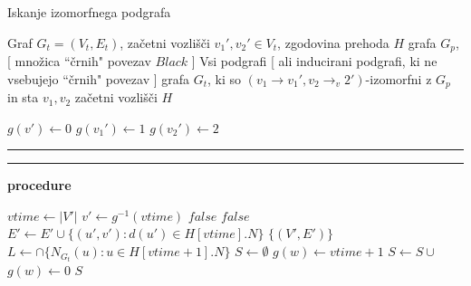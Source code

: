 \documentclass[a4paper, 12pt, ]{book}
\newcommand\Subalg[1]{%
	\Statex%
	\vspace*{-.7\baselineskip}%
	\hspace*{\dimexpr-\algorithmicindent-4pt\relax}%
	\rule{\textwidth}{0.4pt}%
	\Statex%
	
	\vspace*{-.7\baselineskip}%
	\Statex\hspace*{\dimexpr-\algorithmicindent-2pt\relax}%
	\rule{\textwidth}{0.4pt}%
	
	\Statex\hspace*{-\algorithmicindent}\textbf{procedure} #1%
}
\begin{document}
\begin{algorithm}
\caption{Iskanje izomorfnega podgrafa}
\label{alg:sub_st}
\begin{algorithmic}[1]
	\Require Graf $G_t = (V_t, E_t)$, začetni vozlišči $v_1', v_2' \in V_t$, zgodovina prehoda $H$ grafa $G_p$, [ množica ``črnih" povezav $Black$ ]
	\Ensure Vsi podgrafi [ ali inducirani podgrafi, ki ne vsebujejo ``črnih" povezav ] grafa $G_t$, ki so $(v_1 \to v_1', v_2 \to _v2')$-izomorfni z
	 $G_p$ in sta $v_1, v_2$ začetni vozlišči $H$
	 
	 		\label{line:st1}
	 	\State $g(v') \gets 0$
	\EndFor
	\State $g(v_1') \gets 1$
	\State $g(v_2') \gets 2$	\label{line:st4}
	\State \Return {}	\label{line:st5}

	
	\Subalg{}
	\State $vtime \gets |V'|$				\label{line:st6}
	\State $v' \gets g^{-1}(vtime)$			\label{line:st7}
		\label{line:st8}
		\State \Return $false$	
	\EndIf
	\If {[ $H[vtime].N \not = \{ g(u') > 0: (v', u') \in E \}$ \textbf{or} $H[vtime].l \not = l(v')$ ]}		\label{line:st10}
		\State \Return $false$	
	\EndIf
	\State $E' \gets E' \cup \{ (u', v'): d(u') \in H[vtime].N \}$	\label{line:st12}
		\Return $\{ (V', E') \}$		\label{line:st13}
	\EndIf
	\State $L \gets \cap \{ N_{G_t}(u): u \in H[vtime + 1].N \}$	\label{line:st14}
	\State $S \gets \emptyset$		\label{line:st15}
					\label{line:st17}
			\State $g(w) \gets vtime + 1$								\label{line:st18}
			\State $S \gets S \cup$ 	\label{line:st19}
			\State $g(w) \gets 0$									\label{line:st20}
		\EndIf
	\EndFor
	\State \Return $S$
\end{algorithmic}
\end{algorithm}
	
\clearpage
\end{document}
